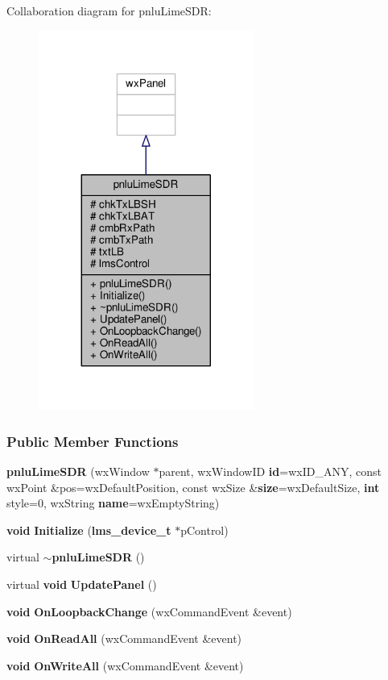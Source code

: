 Collaboration diagram for pnlu\+Lime\+S\+DR\+:
\nopagebreak
\begin{figure}[H]
\begin{center}
\leavevmode
\includegraphics[width=200pt]{d3/de9/classpnluLimeSDR__coll__graph}
\end{center}
\end{figure}
\subsubsection*{Public Member Functions}
\begin{DoxyCompactItemize}
\item 
{\bf pnlu\+Lime\+S\+DR} (wx\+Window $\ast$parent, wx\+Window\+ID {\bf id}=wx\+I\+D\+\_\+\+A\+NY, const wx\+Point \&pos=wx\+Default\+Position, const wx\+Size \&{\bf size}=wx\+Default\+Size, {\bf int} style=0, wx\+String {\bf name}=wx\+Empty\+String)
\item 
{\bf void} {\bf Initialize} ({\bf lms\+\_\+device\+\_\+t} $\ast$p\+Control)
\item 
virtual {\bf $\sim$pnlu\+Lime\+S\+DR} ()
\item 
virtual {\bf void} {\bf Update\+Panel} ()
\item 
{\bf void} {\bf On\+Loopback\+Change} (wx\+Command\+Event \&event)
\item 
{\bf void} {\bf On\+Read\+All} (wx\+Command\+Event \&event)
\item 
{\bf void} {\bf On\+Write\+All} (wx\+Command\+Event \&event)
\end{DoxyCompactItemize}
